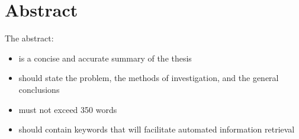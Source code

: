 \chapter{Abstract}

The abstract:
\begin{itemize}
  \item is a concise and accurate summary of the thesis
  \item should state the problem, the methods of investigation, and the general conclusions
  \item must not exceed 350 words
  \item should contain keywords that will facilitate automated information retrieval
\end{itemize}